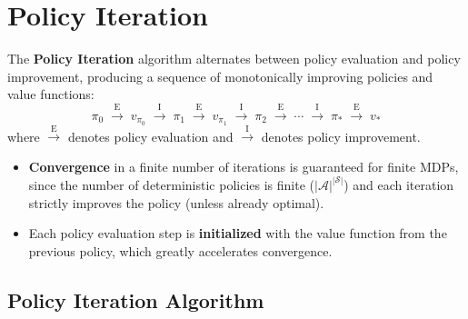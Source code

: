 \documentclass[11pt,a4paper]{article}
\theoremstyle{definition}
\theoremstyle{plain}
\theoremstyle{remark}
\begin{document}
\section{Policy Iteration}

The \textbf{Policy Iteration} algorithm alternates between policy evaluation and policy improvement, producing a sequence of monotonically improving policies and value functions:
\[
    \pi_0 \;\xrightarrow{\text{E}}\; v_{\pi_0} \;\xrightarrow{\text{I}}\; \pi_1 \;\xrightarrow{\text{E}}\; v_{\pi_1} \;\xrightarrow{\text{I}}\; \pi_2 \;\xrightarrow{\text{E}}\; \cdots \;\xrightarrow{\text{I}}\; \pi_* \;\xrightarrow{\text{E}}\; v_*
\]
where $\xrightarrow{\text{E}}$ denotes policy evaluation and $\xrightarrow{\text{I}}$ denotes policy improvement.

\begin{tcolorbox}[colback=blue!5!white, colframe=blue!60!black, title={Key Properties of Policy Iteration}]
\begin{itemize}
    \item \textbf{Convergence} in a finite number of iterations is guaranteed for finite MDPs, since the number of deterministic policies is finite ($|\mathcal{A}|^{|\mathcal{S}|}$) and each iteration strictly improves the policy (unless already optimal).
    \item Each policy evaluation step is \textbf{initialized} with the value function from the previous policy, which greatly accelerates convergence.
\end{itemize}
\end{tcolorbox}

\subsection{Policy Iteration Algorithm}
\end{document}
